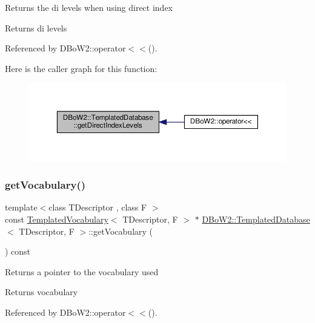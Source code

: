 Returns the di levels when using direct index \begin{DoxyReturn}{Returns}
di levels 
\end{DoxyReturn}


Referenced by D\+Bo\+W2\+::operator$<$$<$().

Here is the caller graph for this function\+:\nopagebreak
\begin{figure}[H]
\begin{center}
\leavevmode
\includegraphics[width=350pt]{classDBoW2_1_1TemplatedDatabase_af1fd1540b9e81fae498d41b87050efb0_icgraph}
\end{center}
\end{figure}
\mbox{\label{classDBoW2_1_1TemplatedDatabase_a2053ce792884183af75e4343026ef7dd}} 
\subsubsection{\texorpdfstring{get\+Vocabulary()}{getVocabulary()}}
{\footnotesize\ttfamily template$<$class T\+Descriptor , class F $>$ \\
const \hyperlink{classDBoW2_1_1TemplatedVocabulary}{Templated\+Vocabulary}$<$ T\+Descriptor, F $>$ $\ast$ \hyperlink{classDBoW2_1_1TemplatedDatabase}{D\+Bo\+W2\+::\+Templated\+Database}$<$ T\+Descriptor, F $>$\+::get\+Vocabulary (\begin{DoxyParamCaption}{ }\end{DoxyParamCaption}) const\hspace{0.3cm}{\ttfamily [inline]}}

Returns a pointer to the vocabulary used \begin{DoxyReturn}{Returns}
vocabulary 
\end{DoxyReturn}


Referenced by D\+Bo\+W2\+::operator$<$$<$().

